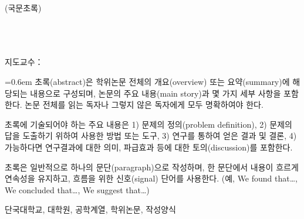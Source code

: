 \clearpage
\thispagestyle{fancy}

\begin{flushright}
  {\fontsize{12}{20}\selectfont (국문초록)}
\end{flushright}


\begin{center}
  {\fontsize{20}{26}\selectfont \thesistitleko}

  {\fontsize{15}{26}\selectfont \thesistitlekosub}
\end{center}

\vspace{5mm}

\begin{flushright}
  {\fontsize{14}{18}\selectfont \gradschool\quad \department}\\
  {\fontsize{14}{18}\selectfont \major}\\
  {\fontsize{14}{18}\selectfont \authorname}\\
  {\fontsize{14}{18}\selectfont 지도교수：\advisorname}
\end{flushright}

\vspace{4mm}

\begingroup
\fontsize{12}{12}\selectfont
\setlength{\parindent}{10pt}
\setlength{\parskip}{0pt}
\spaceskip=0.6em
초록(abstract)은 학위논문 전체의 개요(overview) 또는 요약(summary)에 해당되는 내용으로 구성되며, 논문의 주요 내용(main story)과 몇 가지 세부 사항을 포함한다. 논문 전체를 읽는 독자나 그렇지 않은 독자에게 모두 명확하여야 한다.

초록에 기술되어야 하는 주요 내용은 1) 문제의 정의(problem definition), 2) 문제의 답을 도출하기 위하여 사용한 방법 또는 도구, 3) 연구를 통하여 얻은 결과 및 결론, 4) 가능하다면 연구결과에 대한 의미, 파급효과 등에 대한 토의(discussion)를 포함한다.

초록은 일반적으로 하나의 문단(paragraph)으로 작성하며, 한 문단에서 내용이 흐르게 연속성을 유지하고, 흐름을 위한 신호(signal) 단어를 사용한다. (예, We found that\ldots, We concluded that\ldots, We suggest that\ldots)
\endgroup

\vspace{4mm}

 {\fontsize{12}{16}\selectfont 단국대학교, 대학원, 공학계열, 학위논문, 작성양식}

\newpage
